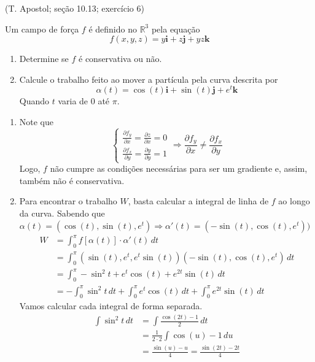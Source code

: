 \documentclass[../main.tex]{subfiles}
\begin{document}
	\begin{exercicio}{3}
		(T. Apostol; seção 10.13; exercício 6)
		
		Um campo de força $f$ é definido no $\mathbb{R}^3$ pela equação
		\[
		f(x,y,z)=y\textbf{i} + z\textbf{j} +yz\textbf{k}
		\]
		\begin{enumerate}[label=\alph*)]
			\item Determine se $f$ é conservativa ou não.
			\item Calcule o trabalho feito ao mover a partícula pela curva descrita por
			\[
			\alpha(t)=\cos(t)\textbf{i}+\sin(t)\textbf{j}+e^t\textbf{k}
			\]
			Quando $t$ varia de $0$ até $\pi$.
		\end{enumerate}
	\end{exercicio}
	\begin{solucao}
		\begin{enumerate}[label=\alph*)]
			\item Note que
			\[
			\begin{cases} \frac{\partial f_y}{\partial x}=\frac{\partial z}{\partial x}=0\\ \frac{\partial f_x}{\partial y}=\frac{\partial y}{\partial y}=1\end{cases}\Rightarrow  \frac{\partial f_y}{\partial x} \neq \frac{\partial f_x}{\partial y}
			\]
			Logo, $f$ não cumpre as condições necessárias para ser um gradiente e, assim, também não é conservativa.
			\item Para encontrar o trabalho $W$, basta calcular a integral de linha de $f$ ao longo da curva. Sabendo que $\alpha(t)=(\cos(t),\sin(t),e^t)\Rightarrow\alpha'(t)=(-\sin(t), \cos(t), e^t))$
			\begin{align*}
				W
				&= \int_0^\pi f[\alpha(t)]\cdot \alpha'(t)\, dt\\
				&= \int_0^\pi (\sin(t), e^t, e^t\sin(t))(-\sin(t), \cos(t), e^t)\, dt\\
				&= \int_0^\pi -\sin^2t +e^t\cos(t) +e^{2t}\sin(t)\, dt\\
				&= -\int_0^\pi \sin^2t\, dt +\int_0^\pi e^t\cos(t)\, dt +\int_0^\pi e^{2t}\sin(t)\, dt
			\end{align*}
			Vamos calcular cada integral de forma separada.
			\begin{align*}
				\int \sin^2t\, dt
				&= \int \frac{\cos(2t)-1}{2}\, dt\\
				&= \frac{1}{2\cdot 2}\int \cos(u)-1\, du\\
				&= \frac{\sin(u)-u}{4}=\frac{\sin(2t)-2t}{4} 
			\end{align*}

\end{enumerate}
\end{solucao}
\end{document}

